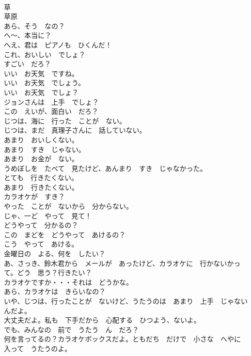 \documentclass[8pt]{extreport}
\begin{document}
\begin{CJK}{UTF8}{min}
\\	草	
\\	草原	
\\	あら、そう　なの？	
\\	へ～、本当に？	
\\	へえ、君は　ピアノも　ひくんだ！	
\\	これ、おいしい　でしょ？	
\\	すごい　だろ？	
\\	いい　お天気　ですね。	
\\	いい　お天気　でしょう。	
\\	いい　お天気　でしょ？	
\\	ジョンさんは　上手　でしょ？	
\\	この　えいが、面白い　だろ？	
\\	じつは、海に　行った　ことが　ない。	
\\	じつは、まだ　真理子さんに　話していない。	
\\	あまり　おいしくない。	
\\	あまり　すき　じゃない。	
\\	あまり　お金が　ない。	
\\	うめぼしを　たべて　見たけど、あんまり　すき　じゃなかった。	
\\	とても　行きたくない。	
\\	あまり　行きたくない。	
\\	カラオケが　すき？	
\\	やった　ことが　ないから　分からない。	
\\	じゃ、一ど　やって　見て！	
\\	どうやって　分かるの？	
\\	この　まどを　どうやって　あけるの？	
\\	こう　やって　あける。	
\\	金曜日の　よる、何を　したい？	
\\	あ、さっき、鈴木君から　メールが　あったけど、カラオケに　行かないかって。どう　思う？行きたい？	
\\	カラオケですか・・・それは　どうかな。	
\\	あら、カラオケは　きらいなの？	
\\	いや、じつは、行ったことが　ないけど、うたうのは　あまり　上手　じゃないんだよ。	
\\	大丈夫だよ。私も　下手だから　心配する　ひつよう、ないよ。	
\\	でも、みんなの　前で　うたう　ん　だろ？	
\\	何を言ってるの？カラオケボックスだよ。ともだち　だけで　小さな　へやに　入って　うたうのよ。	

\end{CJK}
\end{document}
